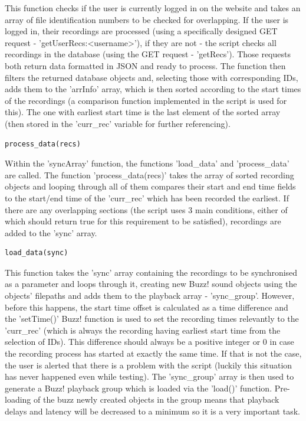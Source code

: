 \documentclass{l3proj}
\begin{document}
This function checks if the user is currently logged in on the website and takes an array of file identification numbers to be checked for overlapping. If the user is logged in, their recordings are processed (using a specifically designed GET request - 'getUserRecs:<username>'), if they are not - the script checks all recordings in the database (using the GET request - 'getRecs'). Those requests both return data formatted in JSON and ready to process. The function then filters the returned database objects and, selecting those with corresponding IDs, adds them to the 'arrInfo' array, which is then sorted according to the start times of the recordings (a comparison function implemented in the script is used for this). The one with earliest start time is the last element of the sorted array (then stored in the 'curr\_rec' variable for further referencing).

\begin{verbatim}
process_data(recs)
\end{verbatim}

Within the 'syncArray' function, the functions 'load\_data' and 'process\_data' are called. The function 'process\_data(recs)' takes the array of sorted recording objects and looping through all of them compares their start and end time fields to the start/end time of the 'curr\_rec' which has been recorded the earliest. If there are any overlapping sections (the script uses 3 main conditions, either of which should return true for this requirement to be satisfied), recordings are added to the 'sync' array.

\begin{verbatim}
load_data(sync)
\end{verbatim}

This function takes the 'sync' array containing the recordings to be synchronised as a parameter and loops through it, creating new Buzz! sound objects using the objects' filepaths and adds them to the playback array - 'sync\_group'. However, before this happens, the start time offset is calculated as a time difference and the 'setTime()' Buzz! function is used to set the recording times relevantly to the 'curr\_rec' (which is always the recording having earliest start time from the selection of IDs). This difference should always be a positive integer or 0 in case the recording process has started at exactly the same time. If that is not the case, the user is alerted that there is a problem with the script (luckily this situation has never happened even while testing). The 'sync\_group' array is then used to generate a Buzz! playback group which is loaded via the 'load()' function. Pre-loading of the buzz newly created objects in the group means that playback delays and latency will be decreased to a minimum so it is a very important task.
\end{document}

